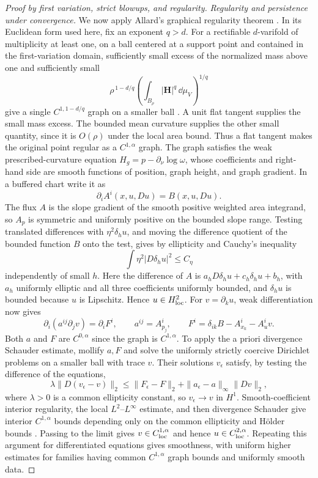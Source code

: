 \begin{proof}[Proof by first variation, strict blowups, and regularity]
\emph{Regularity and persistence under convergence.}
We now apply Allard's graphical regularity theorem \citep{allard1972}.  In its Euclidean form used here,
fix an exponent $q>d$.  For a rectifiable $d$-varifold of multiplicity
at least one, on a ball centered at a support point and contained in
the first-variation domain, sufficiently small excess of the normalized
mass above one and sufficiently small
\[
       \rho^{\,1-d/q}
       \left(\int_{B_\rho}|\mathbf H|^q\,\dd\mu_V\right)^{1/q}
\]
give a single $C^{1,1-d/q}$ graph on a smaller ball
\citep[Chapter~5, Theorem~5.2]{simonGMT}.  A unit flat tangent supplies
the small mass excess.  The bounded mean curvature supplies the other
small quantity, since it is $O(\rho)$ under the local area bound.
Thus a flat tangent makes the original point regular as a
$C^{1,\alpha}$ graph.  The graph satisfies the weak prescribed-curvature
equation $H_g=p-\partial_\nu\log\omega$, whose coefficients and
right-hand side are smooth functions of position, graph height, and
graph gradient. In a buffered chart write it as
\[
 \partial_i A^i(x,u,Du)=B(x,u,Du).
\]
The flux $A$ is the slope gradient of the smooth positive weighted
area integrand, so $A_p$ is symmetric and uniformly positive on the
bounded slope range. Testing translated differences with
$\eta^2\delta_hu$, and moving the difference quotient of the bounded
function $B$ onto the test, gives by ellipticity and Cauchy's inequality
\[
 \int\eta^2|D\delta_hu|^2\le C_\eta
\]
independently of small $h$. Here the difference of $A$ is
$a_hD\delta_hu+c_h\delta_hu+b_h$, with $a_h$ uniformly elliptic and
all three coefficients uniformly bounded, and $\delta_hu$ is bounded
because $u$ is Lipschitz. Hence $u\in H^2_{\rm loc}$. For
$v=\partial_ku$, weak differentiation now gives
\[
 \partial_i(a^{ij}\partial_jv)=\partial_iF^i,\qquad
 a^{ij}=A^i_{p_j},\qquad
 F^i=\delta_{ik}B-A^i_{x_k}-A^i_uv.
\]
Both $a$ and $F$ are $C^{0,\alpha}$ since the graph is $C^{1,\alpha}$.
To apply the a priori divergence Schauder estimate, mollify $a,F$
and solve the uniformly strictly coercive Dirichlet problems on a smaller ball
with trace $v$. Their solutions $v_\epsilon$ satisfy, by testing
the difference of the equations,
\[
 \lambda\|D(v_\epsilon-v)\|_2
 \le\|F_\epsilon-F\|_2+
       \|a_\epsilon-a\|_\infty\|Dv\|_2,
\]
where $\lambda>0$ is a common ellipticity constant, so
$v_\epsilon\to v$ in $H^1$. Smooth-coefficient interior regularity,
the local $L^2$--$L^\infty$ estimate, and then divergence Schauder give
interior $C^{1,\alpha}$ bounds depending only on the common ellipticity
and H\"older bounds
\citep[Lecture~6, Theorem~1 and Corollary~1; Lecture~18, Theorem~2;
Lecture~12, Theorem~1]{simonPDE}.
Passing to the limit gives $v\in C^{1,\alpha}_{\rm loc}$ and hence
$u\in C^{2,\alpha}_{\rm loc}$. Repeating this argument for differentiated
equations gives smoothness, with uniform higher estimates for families
having common $C^{1,\alpha}$ graph bounds and uniformly smooth data.


\end{proof}
